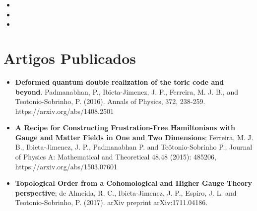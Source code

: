 \documentclass[11pt,a4paper,sans]{moderncv}        %
\begin{document}
\vspace{3pt}

\begin{itemize}

\item{}  %

\vspace{1pt}

\item{}

\vspace{1pt}


\item{}  %


\end{itemize}


\section{Artigos Publicados}

\vspace{3pt}

\begin{itemize}
\item \textbf{Deformed quantum double realization of the toric code and beyond}. Padmanabhan, P., Ibieta-Jimenez, J. P., Ferreira, M. J. B., and Teotonio-Sobrinho, P. (2016). Annals of Physics, 372, 238-259. https://arxiv.org/abs/1408.2501
\vspace{1pt}
\item \textbf{A Recipe for Constructing Frustration-Free Hamiltonians with Gauge and Matter Fields in One and Two Dimensions}; Ferreira, M. J. B., Ibieta-Jimenez, J. P., Padmanabhan P.  and  Teôtonio-Sobrinho P.; Journal of Physics A: Mathematical and Theoretical 48.48 (2015): 485206, https://arxiv.org/abs/1503.07601

\item \textbf{Topological Order from a Cohomological and Higher Gauge Theory perspective}; de Almeida, R. C., Ibieta-Jimenez, J. P., Espiro, J. L. and Teotonio-Sobrinho, P. (2017). arXiv preprint arXiv:1711.04186.
\end{itemize}
\end{document}

